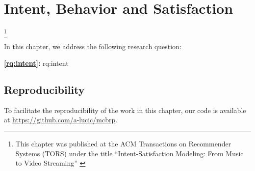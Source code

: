 
\chapter{Intent, Behavior and Satisfaction}
\label{chapter:research-intent}

\footnote[]{This chapter was published at the ACM Transactions on Recommender Systems (TORS) under the title ``Intent-Satisfaction Modeling: From Music to Video Streaming'' \citep{intent}}
\acresetall


In this chapter, we address the following research question:

\medskip
\noindent
\textbf{\ref{rq:intent}:} \acl{rq:intent}
\medskip

\noindent


% 
% 
% 
% 
% 
% 
% 



\section*{Reproducibility}
To facilitate the reproducibility of the work in this chapter, our code is available at \url{https://github.com/a-lucic/mcbrp}.